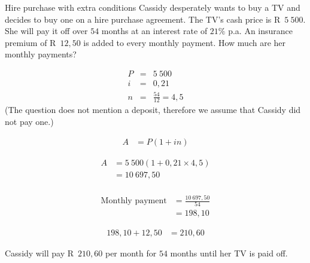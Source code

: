 \begin{wex}{Hire purchase with extra conditions}
{Cassidy desperately wants to buy a TV and decides to buy one on a hire purchase agreement. The TV's cash price is R~$5~500$. She will pay it off over $54$ months at an interest rate of $21\%$ p.a. An insurance premium of R~$12,50$ is added to every monthly payment. How much are her monthly payments?}{

    \begin{eqnarray*}
	P &=& 5~500\\
	i &=& 0,21\\
	n &=& \frac{54}{12} = 4,5
    \end{eqnarray*}
    (The question does not mention a deposit, therefore we assume that Cassidy did not pay one.)

    \begin{align*}
	    A &= P(1 + in)
    \end{align*}

    \begin{align*}
	A &= 5~500(1 + 0,21 \times 4,5)\\
	  &= 10~697,50\\
    \end{align*}

    \begin{align*}
	\mbox{Monthly payment} &= \frac{10~697,50}{54}\\
			&= 198,10
    \end{align*}

    \begin{align*}
	198,10 + 12,50 &= 210,60
    \end{align*}

    Cassidy will pay R~$210,60$ per month for $54$ months until her TV is paid off.
}
\end{wex}




